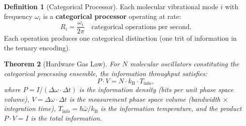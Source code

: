 \documentclass[11pt,a4paper]{article}
\newtheorem{theorem}{Theorem}[section]
\theoremstyle{definition}
\newtheorem{definition}[theorem]{Definition}
\theoremstyle{remark}
\newcommand{\kB}{k_{\mathrm{B}}}
\begin{document}
\begin{definition}[Categorical Processor]
\label{def:cat_processor}
Each molecular vibrational mode $i$ with frequency $\omega_i$ is a \textbf{categorical processor} operating at rate:
\begin{equation}
R_i = \frac{\omega_i}{2\pi} \quad \text{categorical operations per second}.
\end{equation}
Each operation produces one categorical distinction (one trit of information in the ternary encoding).
\end{definition}

\begin{theorem}[Hardware Gas Law]
\label{thm:hardware_gas}
For $N$ molecular oscillators constituting the categorical processing ensemble, the information throughput satisfies:
\begin{equation}
P \cdot V = N \cdot \kB \cdot T_{\mathrm{info}},
\end{equation}
where $P = I / (\Delta\omega \cdot \Delta t)$ is the information density (bits per unit phase space volume), $V = \Delta\omega \cdot \Delta t$ is the measurement phase space volume (bandwidth $\times$ integration time), $T_{\mathrm{info}} = \hbar\bar{\omega}/\kB$ is the information temperature, and the product $P \cdot V = I$ is the total information.
\end{theorem}
\end{document}
